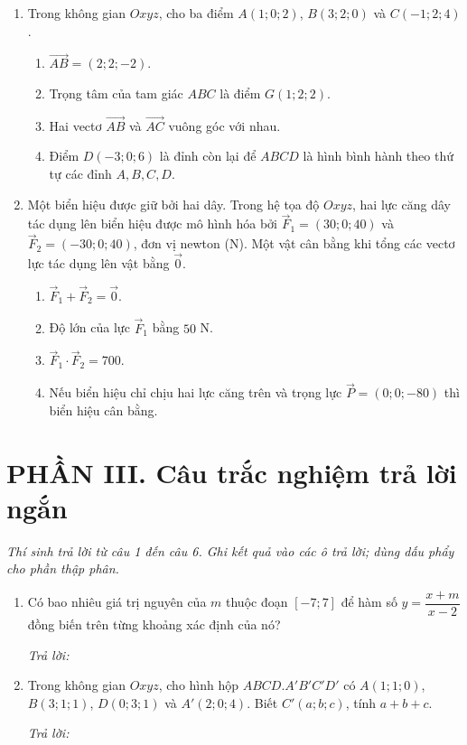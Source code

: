 \documentclass[12pt,a4paper]{article}
\newcommand{\otraloi}{\par\nobreak\smallskip\noindent\textit{Trả lời:}\quad\fbox{\rule{0pt}{11pt}\makebox[0.3cm]{}}\,\fbox{\rule{0pt}{11pt}\makebox[0.3cm]{}}\,\fbox{\rule{0pt}{11pt}\makebox[0.3cm]{}}\,\fbox{\rule{0pt}{11pt}\makebox[0.3cm]{}}}
\begin{document}
\begin{enumerate}[start=3]
\item Trong không gian $Oxyz$, cho ba điểm $A(1;0;2)$, $B(3;2;0)$ và $C(-1;2;4)$.
\begin{enumerate}
\item $\overrightarrow{AB}=(2;2;-2)$.
\item Trọng tâm của tam giác $ABC$ là điểm $G(1;2;2)$.
\item Hai vectơ $\overrightarrow{AB}$ và $\overrightarrow{AC}$ vuông góc với nhau.
\item Điểm $D(-3;0;6)$ là đỉnh còn lại để $ABCD$ là hình bình hành theo thứ tự các đỉnh $A,B,C,D$.
\end{enumerate}

\item Một biển hiệu được giữ bởi hai dây. Trong hệ tọa độ $Oxyz$, hai lực căng dây tác dụng lên
biển hiệu được mô hình hóa bởi $\vec F_1=(30;0;40)$ và $\vec F_2=(-30;0;40)$, đơn vị newton (N).
Một vật cân bằng khi tổng các vectơ lực tác dụng lên vật bằng $\vec0$.
\begin{enumerate}
\item $\vec F_1+\vec F_2=\vec0$.
\item Độ lớn của lực $\vec F_1$ bằng $50$ N.
\item $\vec F_1\cdot\vec F_2=700$.
\item Nếu biển hiệu chỉ chịu hai lực căng trên và trọng lực $\vec P=(0;0;-80)$ thì biển hiệu cân bằng.
\end{enumerate}
\end{enumerate}

\section*{\large PHẦN III. Câu trắc nghiệm trả lời ngắn}
\textit{Thí sinh trả lời từ câu 1 đến câu 6. Ghi kết quả vào các ô trả lời; dùng dấu phẩy cho phần thập phân.}
\begin{enumerate}
\item Có bao nhiêu giá trị nguyên của $m$ thuộc đoạn $[-7;7]$ để hàm số
$y=\dfrac{x+m}{x-2}$ đồng biến trên từng khoảng xác định của nó?
\otraloi

\item Trong không gian $Oxyz$, cho hình hộp $ABCD.A'B'C'D'$ có
$A(1;1;0)$, $B(3;1;1)$, $D(0;3;1)$ và $A'(2;0;4)$.
Biết $C'(a;b;c)$, tính $a+b+c$.
\otraloi
\end{enumerate}
\end{document}
